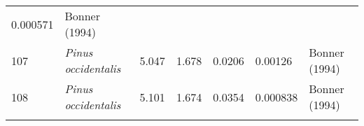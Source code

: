 \documentclass[]{article}
\begin{document}
\begin{longtable}[]{@{}lllllll@{}}
\begin{minipage}[t]{0.08\columnwidth}
0.000571\strut
\end{minipage} & \begin{minipage}[t]{0.23\columnwidth}\raggedright
Bonner (1994)\strut
\end{minipage}\tabularnewline
\begin{minipage}[t]{0.05\columnwidth}\raggedright
107\strut
\end{minipage} & \begin{minipage}[t]{0.23\columnwidth}\raggedright
\emph{Pinus occidentalis}\strut
\end{minipage} & \begin{minipage}[t]{0.05\columnwidth}\raggedright
5.047\strut
\end{minipage} & \begin{minipage}[t]{0.08\columnwidth}\raggedright
1.678\strut
\end{minipage} & \begin{minipage}[t]{0.08\columnwidth}\raggedright
0.0206\strut
\end{minipage} & \begin{minipage}[t]{0.08\columnwidth}\raggedright
0.00126\strut
\end{minipage} & \begin{minipage}[t]{0.23\columnwidth}\raggedright
Bonner (1994)\strut
\end{minipage}\tabularnewline
\begin{minipage}[t]{0.05\columnwidth}\raggedright
108\strut
\end{minipage} & \begin{minipage}[t]{0.23\columnwidth}\raggedright
\emph{Pinus occidentalis}\strut
\end{minipage} & \begin{minipage}[t]{0.05\columnwidth}\raggedright
5.101\strut
\end{minipage} & \begin{minipage}[t]{0.08\columnwidth}\raggedright
1.674\strut
\end{minipage} & \begin{minipage}[t]{0.08\columnwidth}\raggedright
0.0354\strut
\end{minipage} & \begin{minipage}[t]{0.08\columnwidth}\raggedright
0.000838\strut
\end{minipage} & \begin{minipage}[t]{0.23\columnwidth}\raggedright
Bonner (1994)\strut
\end{minipage}\tabularnewline
\begin{minipage}[t]{0.05\columnwidth}\raggedright

\end{minipage}
\end{longtable}
\end{document}

